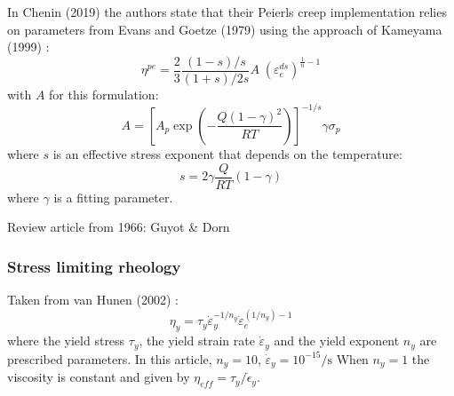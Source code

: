 In Chenin \etal (2019) \cite{chmd19} the authors state that their Peierls creep implementation
relies on parameters from Evans and Goetze (1979) \cite{evgo79} using the approach of 
Kameyama \etal (1999) \cite{kayk99}:
\[
\eta^{pe}=\frac{2}{3} \frac{(1-s)/s}{(1+s)/2s} A \; (\varepsilon_e^{ds})^{\frac{1}{n}-1} 
\]
with $A$ for this formulation:
\[
A = \left[ A_p \exp \left( -\frac{Q(1-\gamma)^2}{RT} \right)  \right]^{-1/s} \gamma \sigma_p
\]
where $s$ is an effective stress exponent that depends on the temperature:
\[
s = 2 \gamma \frac{Q}{RT} (1-\gamma)
\]
where $\gamma$ is a fitting parameter. 


\Literature \cite{basv06,buro11,faff11,gagd14,gery10,goev79,kaka08,kako09,kary01,mesk10,zhwa13,chsm18,shwl17}
Review article from 1966: Guyot \& Dorn \cite{gudo67}


\subsubsection{Stress limiting rheology}

Taken from van Hunen \etal (2002) \cite{vavv02}:
\[
\eta_y = \tau_y \dot{\varepsilon}_y^{-1/n_y} \dot{\varepsilon}_e^{(1/n_y) -1 } 
\]
where the yield stress $\tau_y$, the yield strain rate $\dot{\varepsilon}_y$ and the yield exponent $n_y$ are
prescribed parameters. In this article, $n_y=10$, $\dot{\varepsilon}_y=10^{-15}\si{\per\second}$
When $n_y=1$ the viscosity is constant and given by $\eta_{eff} = \tau_y / \dot{\epsilon}_y$.

